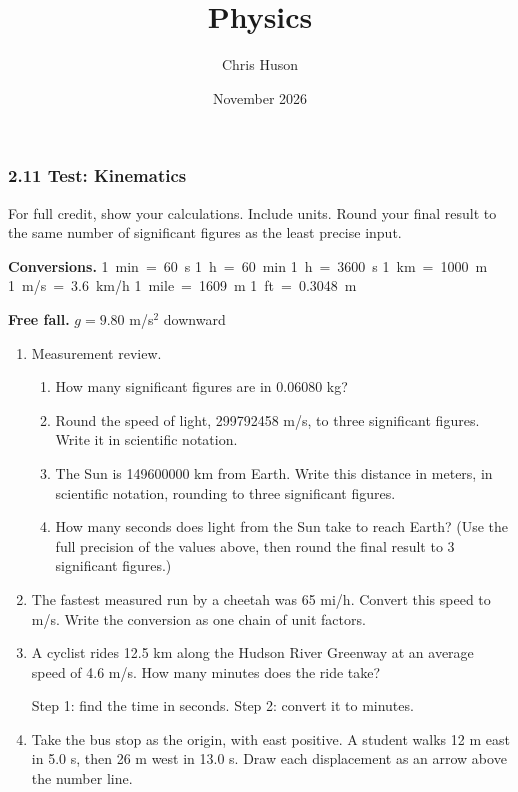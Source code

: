 \documentclass[12pt, twoside]{article}
\title{Physics}
\author{Chris Huson}
\date{November 2026}
\newcommand{\testfront}{%
\subsubsection*{2.11 Test: Kinematics}

For full credit, show your calculations. Include units. Round your final result to
the same number of significant figures as the least precise input.

\textbf{Conversions.} \quad
\mbox{1 min = 60 s} \quad \mbox{1 h = 60 min} \quad \mbox{1 h = 3600 s} \quad
\mbox{1 km = 1000 m} \\
\hspace*{2.65cm}\mbox{1 m/s = 3.6 km/h} \quad \mbox{1 mile = 1609 m} \quad
\mbox{1 ft = 0.3048 m}

\textbf{Free fall.} \quad $g = 9.80$ m/s$^2$ downward

\vspace{0.2cm}}
\begin{document}
\testfront

\begin{enumerate}[itemsep=0.6cm]

\item Measurement review.
  \begin{enumerate}[itemsep=0.6cm]
    \item How many significant figures are in \num{0.06080} kg?
      \vspace{0.8cm}
    \item Round the speed of light, \num{299792458} m/s, to three significant
      figures. Write it in scientific notation.
      \vspace{1.0cm}
    \item The Sun is \num{149600000} km from Earth. Write this distance in meters,
      in scientific notation, rounding to three significant figures.
      \vspace{1.0cm}
    \item How many seconds does light from the Sun take to reach Earth? (Use the
      full precision of the values above, then round the final result to 3
      significant figures.)
      \vspace{3.2cm}
  \end{enumerate}

\item The fastest measured run by a cheetah was 65 mi/h. Convert this speed to m/s.
  Write the conversion as one chain of unit factors.

\newpage

\item A cyclist rides 12.5 km along the Hudson River Greenway at an average speed of
  4.6 m/s. How many minutes does the ride take?

  Step 1: find the time in seconds. \quad Step 2: convert it to minutes.
  \vspace{7.0cm}

\item Take the bus stop as the origin, with east positive. A student walks 12 m
  east in 5.0 s, then 26 m west in 13.0 s. Draw each displacement as an arrow
  above the number line.

  \begin{center}
  \end{center}


\end{enumerate}
\end{document}
